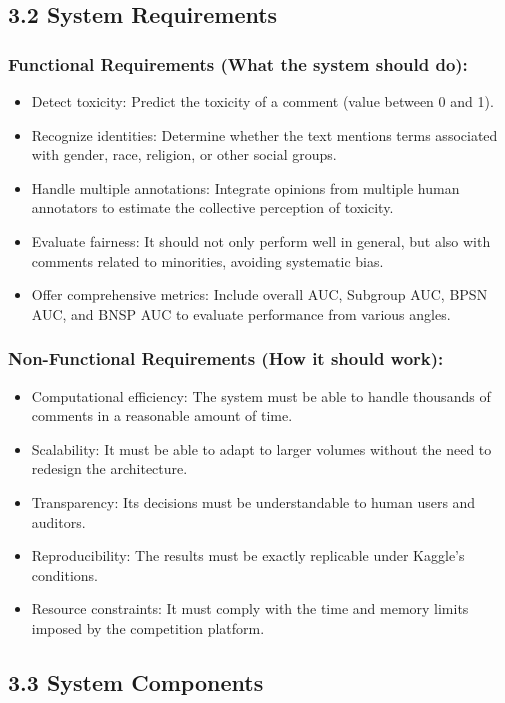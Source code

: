 \documentclass[a4paper,12pt]{article}
\begin{document}
\subsection*{3.2 System Requirements}

\subsubsection*{Functional Requirements (What the system should do):}
\begin{itemize}
    \item Detect toxicity: Predict the toxicity of a comment (value between 0 and 1).
    \item Recognize identities: Determine whether the text mentions terms associated with gender, race, religion, or other social groups.
    \item Handle multiple annotations: Integrate opinions from multiple human annotators to estimate the collective perception of toxicity.
    \item Evaluate fairness: It should not only perform well in general, but also with comments related to minorities, avoiding systematic bias.
    \item Offer comprehensive metrics: Include overall AUC, Subgroup AUC, BPSN AUC, and BNSP AUC to evaluate performance from various angles.
\end{itemize}

\subsubsection*{Non-Functional Requirements (How it should work):}
\begin{itemize}
    \item Computational efficiency: The system must be able to handle thousands of comments in a reasonable amount of time.
    \item Scalability: It must be able to adapt to larger volumes without the need to redesign the architecture.
    \item Transparency: Its decisions must be understandable to human users and auditors.
    \item Reproducibility: The results must be exactly replicable under Kaggle's conditions.
    \item Resource constraints: It must comply with the time and memory limits imposed by the competition platform.
\end{itemize}

\subsection*{3.3 System Components}
\end{document}
